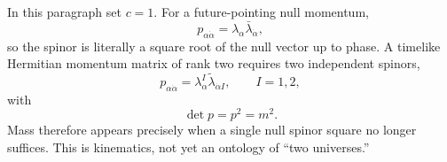 \documentclass[11pt]{article}
\theoremstyle{definition}\newtheorem{definition}[theorem]{Definition}
\theoremstyle{remark}\newtheorem{remark}[theorem]{Remark}\newtheorem{conjecture}[theorem]{Conjecture}
\begin{document}
In this paragraph set $c=1$. For a future-pointing null momentum,
\begin{equation}
 p_{\alpha\dot\alpha}=\lambda_\alpha\bar\lambda_{\dot\alpha},
\end{equation}
so the spinor is literally a square root of the null vector up to phase. A timelike Hermitian momentum matrix of rank two requires two independent spinors,
\begin{equation}\label{eq:massivespinor}
 p_{\alpha\dot\alpha}=\lambda^I_\alpha\tilde\lambda_{\dot\alpha I},\qquad I=1,2,
\end{equation}
with
\begin{equation}
 \det p=p^2=m^2.
\end{equation}
Mass therefore appears precisely when a single null spinor square no longer suffices. This is kinematics, not yet an ontology of ``two universes.''
\end{document}
